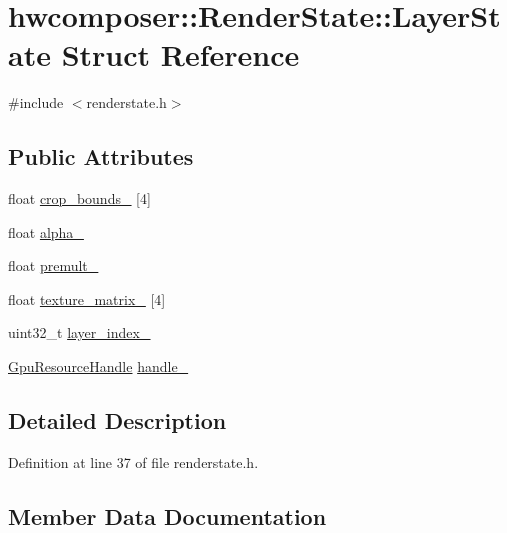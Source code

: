 \hypertarget{structhwcomposer_1_1RenderState_1_1LayerState}{}\section{hwcomposer\+:\+:Render\+State\+:\+:Layer\+State Struct Reference}
\label{structhwcomposer_1_1RenderState_1_1LayerState}


{\ttfamily \#include $<$renderstate.\+h$>$}

\subsection*{Public Attributes}
\begin{DoxyCompactItemize}
\item 
float \mbox{\hyperlink{structhwcomposer_1_1RenderState_1_1LayerState_a2ae0d2985cd27e57fe473666a9e57243}{crop\+\_\+bounds\+\_\+}} \mbox{[}4\mbox{]}
\item 
float \mbox{\hyperlink{structhwcomposer_1_1RenderState_1_1LayerState_aafc535e52757f72e87afd87346e52f05}{alpha\+\_\+}}
\item 
float \mbox{\hyperlink{structhwcomposer_1_1RenderState_1_1LayerState_a43d36ca83789cac1c1957df1f032c1ee}{premult\+\_\+}}
\item 
float \mbox{\hyperlink{structhwcomposer_1_1RenderState_1_1LayerState_afd84107447feedca42841c54c877c96c}{texture\+\_\+matrix\+\_\+}} \mbox{[}4\mbox{]}
\item 
uint32\+\_\+t \mbox{\hyperlink{structhwcomposer_1_1RenderState_1_1LayerState_a2271499cd60f4416b96954d3e79187e0}{layer\+\_\+index\+\_\+}}
\item 
\mbox{\hyperlink{namespacehwcomposer_a3da411c7c0213da2ce847c654bdc180d}{Gpu\+Resource\+Handle}} \mbox{\hyperlink{structhwcomposer_1_1RenderState_1_1LayerState_a08fbf02b64aaf423f2281a9d9e283097}{handle\+\_\+}}
\end{DoxyCompactItemize}


\subsection{Detailed Description}


Definition at line 37 of file renderstate.\+h.



\subsection{Member Data Documentation}
\mbox{\label{structhwcomposer_1_1RenderState_1_1LayerState_aafc535e52757f72e87afd87346e52f05}} 
